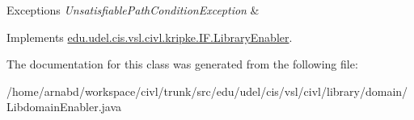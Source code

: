 \begin{DoxyExceptions}{Exceptions}
{\em Unsatisfiable\+Path\+Condition\+Exception} & \\
\hline
\end{DoxyExceptions}


Implements \hyperlink{interfaceedu_1_1udel_1_1cis_1_1vsl_1_1civl_1_1kripke_1_1IF_1_1LibraryEnabler_a7048d9901abda3f7af09cf3827523471}{edu.\+udel.\+cis.\+vsl.\+civl.\+kripke.\+I\+F.\+Library\+Enabler}.



The documentation for this class was generated from the following file\+:\begin{DoxyCompactItemize}
\item 
/home/arnabd/workspace/civl/trunk/src/edu/udel/cis/vsl/civl/library/domain/Libdomain\+Enabler.\+java\end{DoxyCompactItemize}
